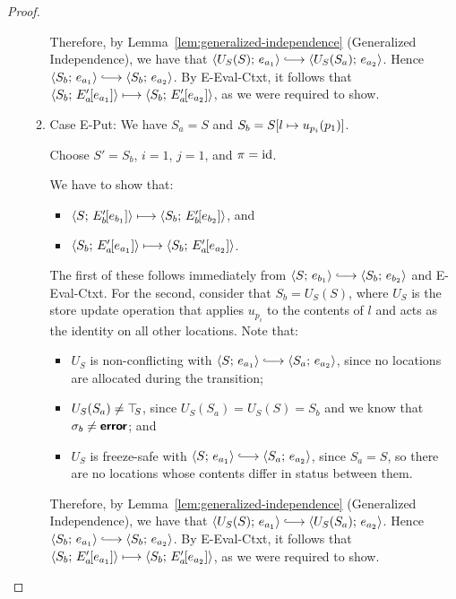\begin{proof}
\begin{enumerate}
\begin{enumerate}
      Therefore, by Lemma~\ref{lem:generalized-independence}
      (Generalized Independence), we have that
      $\config{U_S(S)}{e_{a_1}} \parstepsto
      \config{U_S(S_a)}{e_{a_2}}$.  Hence $\config{S_b}{e_{a_1}}
      \parstepsto \config{S_b}{e_{a_2}}$.  By {\sc E-Eval-Ctxt}, it
      follows that $\langle S_b;\, E'_a\hspace{-1mm}\left[e_{a_1}\right] \rangle \longmapsto
      \langle S_b;\, E'_a\hspace{-1mm}\left[e_{a_2}\right] \rangle$, as we were required to
      show.

    \item \label{slqc-beta-put}Case {\sc E-Put}: We have $S_a = S$ and
      $S_b = S[l \mapsto u_{p_i}(p_1)]$.

      Choose $S' = S_b$, $i = 1$, $j = 1$, and $\pi = \mathrm{id}$.

      We have to show that:
      \begin{itemize}
      \item $\langle S;\, E'_b\hspace{-1mm}\left[e_{b_1}\right] \rangle \longmapsto
        \langle S_b;\, E'_b\hspace{-1mm}\left[e_{b_2}\right] \rangle$, and
      \item $\langle S_b;\, E'_a\hspace{-1mm}\left[e_{a_1}\right] \rangle \longmapsto
        \langle S_b;\, E'_a\hspace{-1mm}\left[e_{a_2}\right] \rangle$.
      \end{itemize}

      The first of these follows immediately from $\config{S}{e_{b_1}}
      \parstepsto \config{S_b}{e_{b_2}}$ and {\sc E-Eval-Ctxt}.  For
      the second, consider that $S_b = U_S(S)$, where $U_S$ is the
      store update operation that applies $u_{p_i}$ to the contents of
      $l$ and acts as the identity on all other locations.  Note that:
      \begin{itemize}
      \item $U_S$ is non-conflicting with $\config{S}{e_{a_1}}
        \parstepsto \config{S_a}{e_{a_2}}$, since no locations are
        allocated during the transition;
        \item $U_S(S_a) \neq \top\hspace{-0.85mm}_{S}$, since $U_S(S_a) = U_S(S) = S_b$
          and we know that $\sigma_b \neq \textbf{\textsf{error}}$; and
        \item $U_S$ is freeze-safe with $\config{S}{e_{a_1}}
          \parstepsto \config{S_a}{e_{a_2}}$, since $S_a = S$, so
          there are no locations whose contents differ in status
          between them.
      \end{itemize}

      Therefore, by Lemma~\ref{lem:generalized-independence}
      (Generalized Independence), we have that
      $\config{U_S(S)}{e_{a_1}} \parstepsto
      \config{U_S(S_a)}{e_{a_2}}$.  Hence $\config{S_b}{e_{a_1}}
      \parstepsto \config{S_b}{e_{a_2}}$.  By {\sc E-Eval-Ctxt}, it
      follows that $\langle S_b;\, E'_a\hspace{-1mm}\left[e_{a_1}\right] \rangle \longmapsto
      \langle S_b;\, E'_a\hspace{-1mm}\left[e_{a_2}\right] \rangle$, as we were required to
      show.


\end{enumerate}
\end{enumerate}
\end{proof}
